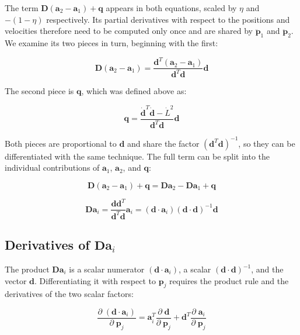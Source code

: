 \documentclass[]{article}
\newcommand{\pd}[2]{\frac{\partial\;#1}{\partial\;#2}}
\begin{document}
The term $\mathbf{D} (\mathbf{a}_2 - \mathbf{a}_1) + \mathbf{q}$ appears in both equations, scaled by $\eta$ and $-(1-\eta)$ respectively.  Its partial derivatives with respect to the positions and velocities therefore need to be computed only once and are shared by $\ddot{\mathbf{p}}_1$ and $\ddot{\mathbf{p}}_2$.  We examine its two pieces in turn, beginning with the first:

\begin{equation}
    \mathbf{D} (\mathbf{a}_2 - \mathbf{a}_1) = \frac{\mathbf{d}^T (\mathbf{a}_2 - \mathbf{a}_1)}{\mathbf{d}^T \mathbf{d}} \mathbf{d}
\end{equation}

The second piece is $\mathbf{q}$, which was defined above as:

\begin{equation}
    \mathbf{q} = \frac{\dot{\mathbf{d}}^T \dot{\mathbf{d}} - \dot{L}^2}{\mathbf{d}^T \mathbf{d}} \mathbf{d}
\end{equation}

Both pieces are proportional to $\mathbf{d}$ and share the factor $(\mathbf{d}^T \mathbf{d})^{-1}$, so they can be differentiated with the same technique.  The full term can be split into the individual contributions of $\mathbf{a}_1$, $\mathbf{a}_2$, and $\mathbf{q}$:

\begin{equation}
    \mathbf{D} (\mathbf{a}_2 - \mathbf{a}_1) + \mathbf{q} = \mathbf{D} \mathbf{a}_2 - \mathbf{D} \mathbf{a}_1 + \mathbf{q}
\end{equation}

\begin{equation}
    \mathbf{D} \mathbf{a}_i = \frac{\mathbf{d} \mathbf{d}^T}{\mathbf{d}^T \mathbf{d}} \mathbf{a}_i = (\mathbf{d} \cdot \mathbf{a}_i) (\mathbf{d} \cdot \mathbf{d})^{-1} \mathbf{d}
\end{equation}

\subsection{Derivatives of $\mathbf{D} \mathbf{a}_i$}

The product $\mathbf{D} \mathbf{a}_i$ is a scalar numerator $(\mathbf{d} \cdot \mathbf{a}_i)$, a scalar $(\mathbf{d} \cdot \mathbf{d})^{-1}$, and the vector $\mathbf{d}$.  Differentiating it with respect to $\mathbf{p}_j$ requires the product rule and the derivatives of the two scalar factors:

\begin{equation}
    \pd{(\mathbf{d} \cdot \mathbf{a}_i)}{\mathbf{p}_j} = \mathbf{a}_i^T \pd{\mathbf{d}}{\mathbf{p}_j} + \mathbf{d}^T \pd{\mathbf{a}_i}{\mathbf{p}_j}
\end{equation}
\end{document}
